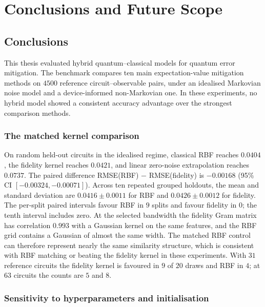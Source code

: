 \documentclass[Thesis.tex]{subfiles}
\begin{document}
\setcounter{chapter}{6} %



\chapter{Conclusions and Future Scope}\label{chap7:conclusion}

\section{Conclusions}

This thesis evaluated hybrid quantum--classical models for quantum error
mitigation. The benchmark compares ten main expectation-value mitigation methods
on $4500$ reference circuit--observable pairs, under an idealised Markovian noise
model and a device-informed non-Markovian one. In these experiments, no hybrid
model showed a consistent accuracy advantage over the strongest comparison
methods.

\subsection{The matched kernel comparison}

On random held-out circuits in the idealised regime, classical RBF reaches
$0.0404$, the fidelity kernel reaches $0.0421$, and
linear zero-noise extrapolation reaches $0.0737$. The paired difference
RMSE(RBF) $-$ RMSE(fidelity) is $-0.00168$ (95\% CI $[-0.00324,\allowbreak -0.00071]$). Across ten repeated
grouped holdouts, the mean and standard deviation are $0.0416\pm0.0011$
for RBF and $0.0426\pm0.0012$ for fidelity. The per-split paired intervals
favour RBF in $9$ splits and favour fidelity in $0$; the tenth interval includes zero.
At the selected bandwidth the fidelity Gram matrix has correlation $0.993$ with a
Gaussian kernel on the same features, and the RBF grid contains a Gaussian of almost
the same width. The matched RBF control can therefore represent nearly the same
similarity structure, which is consistent with RBF matching or beating the fidelity
kernel in these experiments. With $31$ reference circuits the fidelity kernel is
favoured in $9$ of $20$ draws and RBF in $4$; at $63$ circuits the counts are $5$
and $8$.

\subsection{Sensitivity to hyperparameters and initialisation}
\end{document}
